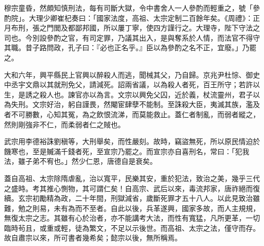 \begin{pinyinscope}
 穆宗童昏，然頗知慎刑法，每有司斷大獄，令中書舍人一人參酌而輕重之，號「參酌院」。大理少卿崔杞奏曰：「國家法度，高祖、太宗定制二百餘年矣。《周禮》：正月布刑，張之門閭及都鄙邦國，所以屢丁寧，使四方謹行之。大理寺，陛下守法之司也。今別設參酌之官，有司定罪，乃議其出入，是與奪系於人情，而法官不得守其職。昔子路問政，孔子曰：『必也正名乎。』臣以為參酌之名不正，宜廢。」乃罷之。



 大和六年，興平縣民上官興以醉殺人而逃，聞械其父，乃自歸。京兆尹杜悰、御史中丞宇文鼎以其就刑免父，請減死。詔兩省議，以為殺人者死，百王所守；若許以生，是誘之殺人也。諫官亦以為言。文宗以興免父囚，近於義，杖流靈州，君子以為失刑。文宗好治，躬自謹畏，然閹宦肆孽不能制。至誅殺大臣，夷滅其族，濫及者不可勝數，心知其冤，為之飲恨流涕，而莫能救止。蓋仁者制亂，而弱者縱之，然則剛強非不仁，而柔弱者仁之賊也。



 武宗用李德裕誅劉稹等，大刑舉矣，而性嚴刻。故時，竊盜無死，所以原民情迫於饑寒也，至是贓滿千錢者死，至宣宗乃罷之。而宣宗亦自喜刑名，常曰：「犯我法，雖子弟不宥也。」然少仁恩，唐德自是衰矣。



 蓋自高祖、太宗除隋虐亂，治以寬平，民樂其安，重於犯法，致治之美，幾乎三代之盛時。考其推心惻物，其可謂仁矣！自高宗、武后以來，毒流邦家，唐祚絕而復續。玄宗初勵精為政，二十年間，刑獄減省，歲斷死罪才五十八人。以此見致治雖難，勉之則易，未有為而不至者。自此以後，兵革遂興，國家多故，而人主規規，無復太宗之志。其雖有心於治者，亦不能講考大法，而性有寬猛，凡所更革，一切臨時茍且，或重或輕，徒為繁文，不足以示後世。而高祖、太宗之法，僅守而存。故自肅宗以來，所可書者幾希矣；懿宗以後，無所稱焉。



\end{pinyinscope}